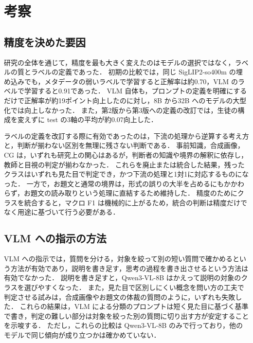 \section{考察}
\label{sec_discussion}
\subsection{精度を決めた要因}
研究の全体を通じて，精度を最も大きく変えたのはモデルの選択ではなく，ラベルの質とラベルの定義であった．
初期の比較では，同じ SigLIP2-so400m の埋め込みでも，メタデータの弱いラベルで学習すると正解率は約0.70，VLM のラベルで学習すると0.91であった．
VLM 自体も，プロンプトの定義を明確にするだけで正解率が約19ポイント向上したのに対し，8B から32B へのモデルの大型化では向上しなかった．
また，第2版から第3版への定義の改訂では，生徒の構成を変えずに test の3軸の平均が約0.07向上した．

ラベルの定義を改訂する際に有効であったのは，下流の処理から逆算する考え方と，判断が揃わない区別を無理に残さない判断である．
事前知識，合成画像，CG は，いずれも研究上の関心はあるが，判断者の知識や境界の解釈に依存し，教師と目視の判定が揃わなかった．
これらを廃止または統合した結果，残ったクラスはいずれも見た目で判定でき，かつ下流の処理と1対1に対応するものになった．
一方で，お題文と通常の境界は，形式の誤りの大半を占めるにもかかわらず，お題文の読み取りという処理に直結するため維持した．
精度のためにクラスを統合すると，マクロ F1 は機械的に上がるため，統合の判断は精度だけでなく用途に基づいて行う必要がある．

\subsection{VLM への指示の方法}
VLM への指示では，質問を分ける，対象を絞って別の短い質問で確かめるという方法が有効であり，説明を書き足す，思考の過程を書き出させるという方法は有効でなかった．
説明を書き足すと，Qwen3-VL-8B はかえって説明の対象のクラスを選びやすくなった．
また，見た目で区別しにくい概念を問い方の工夫で判定させる試みは，合成画像やお題文の体裁の質問のように，いずれも失敗した．
これらの結果は，VLM による分類のプロンプトは短く見た目に基づく基準で書き，判定の難しい部分は対象を絞った別の質問に切り出す方が安定することを示唆する．
ただし，これらの比較は Qwen3-VL-8B のみで行っており，他のモデルで同じ傾向が成り立つかは確かめていない．

